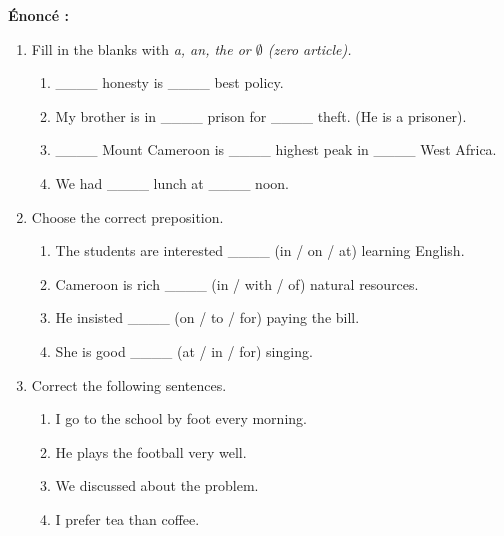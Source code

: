 \documentclass[11pt]{article}
\newcommand{\eng}[1]{\ifmmode\text{\textit{#1}}\else\begingroup\selectlanguage{english}\itshape #1\endgroup\fi}
\begin{document}
\begin{exoresolu}
\textbf{Énoncé :}
\begin{enumerate}
    \item Fill in the blanks with \eng{a, an, the} or $\emptyset$ (zero article).
    \begin{enumerate}
        \item \_\_\_\_ honesty is \_\_\_\_ best policy.
        \item My brother is in \_\_\_\_ prison for \_\_\_\_ theft. (He is a prisoner).
        \item \_\_\_\_ Mount Cameroon is \_\_\_\_ highest peak in \_\_\_\_ West Africa.
        \item We had \_\_\_\_ lunch at \_\_\_\_ noon.
    \end{enumerate}
    \item Choose the correct preposition.
    \begin{enumerate}
        \item The students are interested \_\_\_\_ (in / on / at) learning English.
        \item Cameroon is rich \_\_\_\_ (in / with / of) natural resources.
        \item He insisted \_\_\_\_ (on / to / for) paying the bill.
        \item She is good \_\_\_\_ (at / in / for) singing.
    \end{enumerate}
    \item Correct the following sentences.
    \begin{enumerate}
        \item I go to the school by foot every morning.
        \item He plays the football very well.
        \item We discussed about the problem.
        \item I prefer tea than coffee.
    \end{enumerate}
\end{enumerate}


\end{exoresolu}
\end{document}

